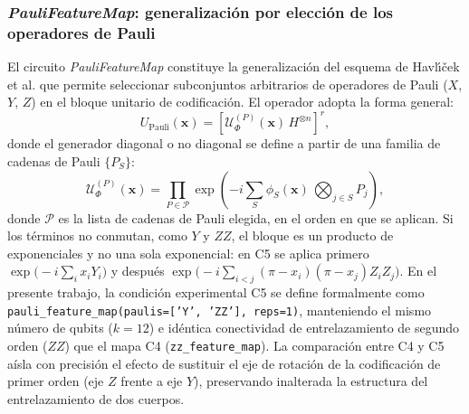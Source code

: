 
\subsubsection{\textit{PauliFeatureMap}: generalización por elección de los operadores de Pauli}
\label{sec:paulifeaturemap}

El circuito \textit{PauliFeatureMap} constituye la generalización del esquema de
Havl{\'{\i}}{\v{c}}ek et al. que permite seleccionar subconjuntos arbitrarios de
operadores de Pauli ($X$, $Y$, $Z$) en el bloque unitario de codificación. El operador
adopta la forma general:
\begin{equation}
  U_{\text{Pauli}}(\mathbf{x}) = \left[\mathcal{U}_\Phi^{(P)}(\mathbf{x})\,H^{\otimes n}\right]^r,
  \label{eq:paulifeaturemap}
\end{equation}
donde el generador diagonal o no diagonal se define a partir de una familia de cadenas
de Pauli $\{P_S\}$:
\begin{equation}
  \mathcal{U}_\Phi^{(P)}(\mathbf{x}) = \prod_{P \in \mathcal{P}}
  \exp\!\left(-i \sum_{S} \phi_S(\mathbf{x})\,\bigotimes_{j \in S} P_j\right),
  \label{eq:pauli_expansion}
\end{equation}
donde $\mathcal{P}$ es la lista de cadenas de Pauli elegida, en el orden en que se aplican. Si los
términos no conmutan, como $Y$ y $ZZ$, el bloque es un producto de exponenciales y no una
sola exponencial: en C5 se aplica primero $\exp\bigl(-i\sum_i x_i Y_i\bigr)$ y después
$\exp\bigl(-i\sum_{i<j}(\pi-x_i)(\pi-x_j)Z_iZ_j\bigr)$.
En el presente trabajo, la condición experimental C5 se define formalmente como
\texttt{pauli\_feature\_map(paulis=['Y', 'ZZ'], reps=1)}, manteniendo el mismo número
de qubits ($k = 12$) e idéntica conectividad de entrelazamiento de segundo orden
($ZZ$) que el mapa C4 (\texttt{zz\_feature\_map}). La
comparación entre C4 y C5 aísla con precisión el efecto de sustituir el eje de rotación
de la codificación de primer orden (eje $Z$ frente a eje $Y$), preservando
inalterada la estructura del entrelazamiento de dos cuerpos.


